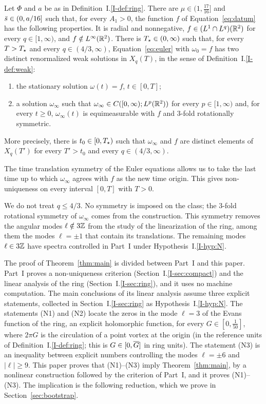 \begin{theorem}
\label{thm:main}
Let $\Phi$ and $a$ be as in Definition~I.\ref{I-def:ring}. There are
$\mu\in(1,\frac{17}{16}]$ and $\bar s\in(0,a/16]$ such that, for every $A_1>0$,
the function $f$ of Equation~\eqref{eq:datum} has the following properties. It
is radial and nonnegative, $f\in (L^1\cap L^q)(\mathbb{R}^2)$ for every $q\in[1,\infty)$,
and $f\notin L^\infty(\mathbb{R}^2)$. There is $T_\star\in(0,\infty)$ such that, for
every $T>T_\star$ and every $q\in(4/3,\infty)$, Equation~\eqref{eq:euler} with
$\omega_0=f$ has two distinct renormalized weak solutions in $X_q(T)$, in the
sense of Definition~I.\ref{I-def:weak}:
\begin{enumerate}[label=\textup{(\roman*)}]
\item the stationary solution $\omega(t)=f$, $t\in[0,T]$;
\item a solution $\omega_\infty$ such that
  $\omega_\infty\in C([0,\infty);L^p(\mathbb{R}^2))$ for every $p\in[1,\infty)$ and,
  for every $t\ge0$, $\omega_\infty(t)$ is equimeasurable with $f$ and
  $3$-fold rotationally symmetric.
\end{enumerate}
More precisely, there is $t_0\in[0,T_\star)$ such that $\omega_\infty$ and $f$
are distinct elements of $X_q(T')$ for every $T'>t_0$ and every
$q\in(4/3,\infty)$.
\end{theorem}

The time translation symmetry of the Euler equations allows us to take the
last time up to which $\omega_\infty$ agrees with $f$ as the new time origin.
This gives non-uniqueness on every interval $[0,T]$ with $T>0$.

We do not treat $q\le4/3$. No symmetry is
imposed on the class; the $3$-fold rotational symmetry of $\omega_\infty$ comes from the
construction. This symmetry removes the angular modes $\ell\notin3\mathbb{Z}$ from
the study of the linearization of the ring, among them the modes $\ell=\pm1$
that contain its translations. The remaining modes $\ell\in3\mathbb{Z}$ have spectra
controlled in Part~I under Hypothesis~I.\ref{I-hyp:N}.

The proof of Theorem~\ref{thm:main} is divided between Part~I and this paper.
Part~I proves a non-uniqueness criterion (Section~I.\ref{I-sec:compact}) and the
linear analysis of the ring (Section~I.\ref{I-sec:ring}), and it uses no machine
computation. The main conclusions of its linear analysis assume three explicit
statements, collected in Section~I.\ref{I-sec:ring} as
Hypothesis~I.\ref{I-hyp:N}. The statements \textup{(N1)} and \textup{(N2)} locate
the zeros in the mode $\ell=3$ of the Evans function of the ring, an explicit
holomorphic function, for every $G\in[0,\frac1{50}]$, where $2\pi G$ is the
circulation of a point vortex at the origin (in the reference units of
Definition~I.\ref{I-def:ring}; this is $G\in[0,\overline{G}]$ in ring units). The
statement \textup{(N3)} is an inequality between explicit numbers controlling
the modes $\ell=\pm6$ and $|\ell|\ge9$. This paper proves that
\textup{(N1)}--\textup{(N3)} imply Theorem~\ref{thm:main}, by a nonlinear
construction followed by the criterion of Part~I, and it proves
\textup{(N1)}--\textup{(N3)}. The implication is the following reduction,
which we prove in Section~\ref{sec:bootstrap}.

